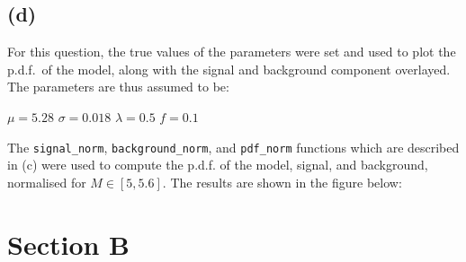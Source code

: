 \documentclass[12pt]{report} %
\begin{document}
\subsection*{(d)}  

For this question, the true values of the parameters were set and used to plot the p.d.f.\ of the model, along with the signal and background component overlayed. The parameters are thus assumed to be:

\begin{center}
    $\mu = 5.28$  
    $\sigma = 0.018$  
    $\lambda = 0.5$  
    $f = 0.1$
\end{center}

The \texttt{signal\_norm}, \texttt{background\_norm}, and \texttt{pdf\_norm} functions which are described in (c) were used to compute the p.d.f. of the model, signal, and background, normalised for $M\in{[5,5.6]}$. The results are shown in the figure below:



\section{Section B}
\end{document}
